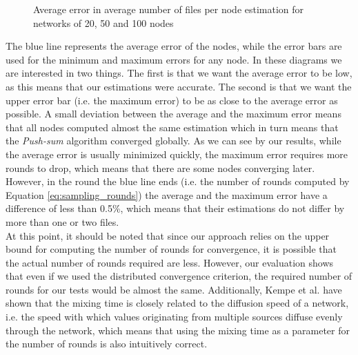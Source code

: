 \documentclass[a4paper,11pt,twoside]{report}
\begin{document}
\begin{figure}[h]
\centering
{}
\qquad
{}
\qquad
{}
\caption{Average error in  average number of files per node estimation for networks of  20, 50 and 100 nodes}
\label{fig:sampling_app_estimations}
\end{figure}

The blue line represents the average error of the nodes, while the error bars are used for the minimum and maximum errors for any node. In these diagrams we are interested in two things. The first is that we want the average error to be low, as this means that our estimations were accurate. The second is that we want the upper error bar (i.e. the maximum error) to be as close to the average error as possible. A small deviation between the average and the maximum error means that all nodes computed almost the same estimation which in turn means that the \textit{Push-sum} algorithm converged globally. As we can see by our results, while the average error is usually minimized quickly, the maximum error requires more rounds to drop, which means that there are some nodes converging later. However, in the round the blue line ends (i.e. the number of rounds computed by Equation \ref{eq:sampling_rounds}) the average and the maximum error have a difference of less than 0.5\%, which means that their estimations do not differ by more than one or two files.\\

At this point, it should be noted that since our approach relies on the upper bound for computing the number of rounds for convergence, it is possible that the actual number of rounds required are less. However, our evaluation shows that even if we used the distributed convergence criterion, the required number of rounds for our tests would be almost the same. Additionally, Kempe et al.\cite{Kempe:2003:GCA:946243.946317} have shown that the mixing time is closely related to the diffusion speed of a network, i.e. the speed with which values originating from multiple sources diffuse evenly through the network, which means that using the mixing time as a parameter for the number of rounds is also intuitively correct.
\end{document}
